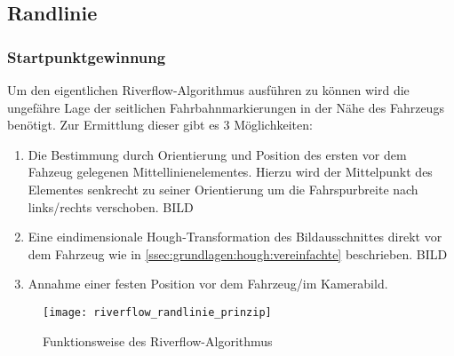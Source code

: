 \subsection{Randlinie} \label{ssec:fahrspurerkennung:riverflow:randlinie}
\subsubsection{Startpunktgewinnung}
Um den eigentlichen Riverflow-Algorithmus ausführen zu können wird die ungefähre Lage der seitlichen Fahrbahnmarkierungen in der Nähe des Fahrzeugs benötigt. Zur Ermittlung dieser gibt es 3 Möglichkeiten:
\begin{enumerate}
\item \label{item:solidline:startpoints:dashedline}
Die Bestimmung durch Orientierung und Position des ersten vor dem Fahzeug gelegenen Mittellinienelementes. Hierzu wird der Mittelpunkt des Elementes senkrecht zu seiner Orientierung um die Fahrspurbreite nach links/rechts verschoben. BILD
\item \label{item:solidline:startpoints:hough}
Eine eindimensionale Hough-Transformation des Bildausschnittes direkt vor dem Fahrzeug wie in \ref{ssec:grundlagen:hough:vereinfachte} beschrieben. BILD
\item \label{item:solidline:startpoints:fixed}
Annahme einer festen Position vor dem Fahrzeug/im Kamerabild.
\end{enumerate}

\begin{figure}[htb]
  \centering
  \texttt{[image: riverflow\_randlinie\_prinzip]}
  \caption{Funktionsweise des Riverflow-Algorithmus}
  \label{fig:riverflow:randlinie:prinzip}
\end{figure}

